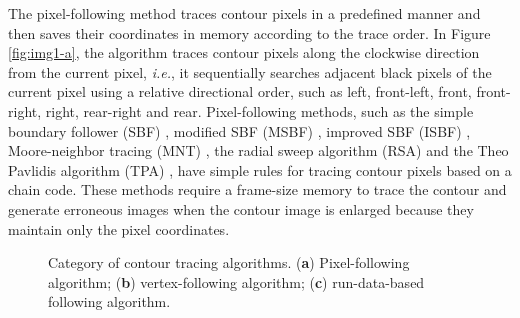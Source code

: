 \documentclass[sensors,article,accept,moreauthors,pdftex,10pt,a4paper]{mdpi}
\begin{document}
The pixel-following method traces contour pixels in a predefined manner and then saves their coordinates in memory according to the trace order. In Figure \ref{fig:img1-a}, the algorithm traces contour pixels along the clockwise direction from the current pixel, \emph{i.e.}, it sequentially searches adjacent black pixels of the current pixel using a relative directional order, such as left, front-left, front, front-right, right, rear-right and rear. Pixel-following methods, such as the simple boundary follower (SBF) \cite{Pitas2000Digital,Das1990Bivariate,Papert1973Uses}, modified SBF (MSBF) \cite{Gose1996Pattern}, improved SBF (ISBF) \cite{Cheong2006Improved}, Moore-neighbor tracing (MNT) \cite{Toussaint????Grids}, the radial sweep algorithm (RSA) \cite{Reddy2012Evaluation} and the Theo Pavlidis algorithm (TPA) \cite{Pavlidis2012Algorithms}, have simple rules for tracing contour pixels based on a chain code. These methods require a frame-size memory to trace the contour and generate erroneous images when the contour image is enlarged \cite{Miyatake1997Contour} because they maintain only the pixel coordinates.
\begin{figure}[H]
	\centering
	 
	\caption{Category of contour tracing algorithms. (\textbf{a}) Pixel-following algorithm; (\textbf{b}) vertex-following algorithm; (\textbf{c}) run-data-based following algorithm.}
	\label{fig:image1}
\end{figure}
\end{document}
